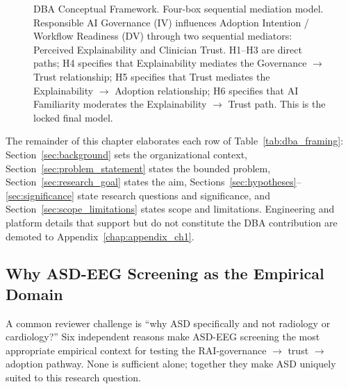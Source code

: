 \begin{figure}[!htbp]
{%
}
\caption[DBA conceptual framework]{DBA Conceptual Framework. Four-box sequential mediation model. Responsible AI Governance (IV) influences Adoption Intention / Workflow Readiness (DV) through two sequential mediators: Perceived Explainability and Clinician Trust. H1--H3 are direct paths; H4 specifies that Explainability mediates the Governance $\to$ Trust relationship; H5 specifies that Trust mediates the Explainability $\to$ Adoption relationship; H6 specifies that AI Familiarity moderates the Explainability $\to$ Trust path. This is the locked final model.}
\label{fig:dba_conceptual_framework}
\end{figure}

\noindent The remainder of this chapter elaborates each row of Table~\ref{tab:dba_framing}: Section~\ref{sec:background} sets the organizational context, Section~\ref{sec:problem_statement} states the bounded problem, Section~\ref{sec:research_goal} states the aim, Sections~\ref{sec:hypotheses}--\ref{sec:significance} state research questions and significance, and Section~\ref{sec:scope_limitations} states scope and limitations. Engineering and platform details that support but do not constitute the DBA contribution are demoted to Appendix~\ref{chap:appendix_ch1}.

\subsection*{Why ASD-EEG Screening as the Empirical Domain}
\label{sec:why_asd_justification}

\noindent A common reviewer challenge is ``why ASD specifically and not radiology or cardiology?'' Six independent reasons make ASD-EEG screening the most appropriate empirical context for testing the RAI-governance $\to$ trust $\to$ adoption pathway. None is sufficient alone; together they make ASD uniquely suited to this research question.

